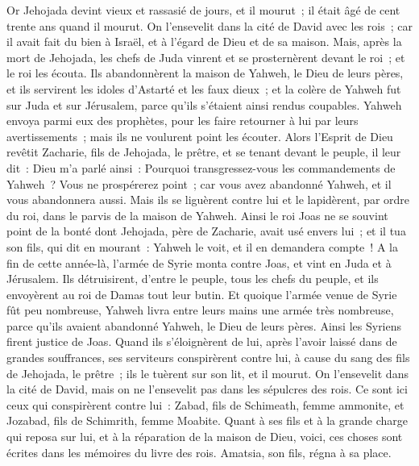 \begin{multicols}{2}
Or Jehojada devint vieux et rassasié de jours, et il mourut~; il était âgé de cent trente ans quand il mourut.
On l'ensevelit dans la cité de David avec les rois~; car il avait fait du bien à Israël, et à l'égard de Dieu et de sa maison.
Mais, après la mort de Jehojada, les chefs de Juda vinrent et se prosternèrent devant le roi~; et le roi les écouta.
Ils abandonnèrent la maison de Yahweh, le Dieu de leurs pères, et ils servirent les idoles d'Astarté et les faux dieux~; et la colère de Yahweh fut sur Juda et sur Jérusalem, parce qu'ils s'étaient ainsi rendus coupables.
Yahweh envoya parmi eux des prophètes, pour les faire retourner à lui par leurs avertissements~; mais ils ne voulurent point les écouter.
Alors l'Esprit de Dieu revêtit Zacharie, fils de Jehojada, le prêtre, et se tenant devant le peuple, il leur dit~: Dieu m'a parlé ainsi~: Pourquoi transgressez-vous les commandements de Yahweh~? Vous ne prospérerez point~; car vous avez abandonné Yahweh, et il vous abandonnera aussi.
Mais ils se liguèrent contre lui et le lapidèrent, par ordre du roi, dans le parvis de la maison de Yahweh.
Ainsi le roi Joas ne se souvint point de la bonté dont Jehojada, père de Zacharie, avait usé envers lui~; et il tua son fils, qui dit en mourant~: Yahweh le voit, et il en demandera compte~!
A la fin de cette année-là, l'armée de Syrie monta contre Joas, et vint en Juda et à Jérusalem. Ils détruisirent, d'entre le peuple, tous les chefs du peuple, et ils envoyèrent au roi de Damas tout leur butin.
Et quoique l'armée venue de Syrie fût peu nombreuse, Yahweh livra entre leurs mains une armée très nombreuse, parce qu'ils avaient abandonné Yahweh, le Dieu de leurs pères. Ainsi les Syriens firent justice de Joas.
Quand ils s'éloignèrent de lui, après l'avoir laissé dans de grandes souffrances, ses serviteurs conspirèrent contre lui, à cause du sang des fils de Jehojada, le prêtre~; ils le tuèrent sur son lit, et il mourut. On l'ensevelit dans la cité de David, mais on ne l'ensevelit pas dans les sépulcres des rois.
Ce sont ici ceux qui conspirèrent contre lui~: Zabad, fils de Schimeath, femme ammonite, et Jozabad, fils de Schimrith, femme Moabite.
Quant à ses fils et à la grande charge qui reposa sur lui, et à la réparation de la maison de Dieu, voici, ces choses sont écrites dans les mémoires du livre des rois. Amatsia, son fils, régna à sa place.

\end{multicols}
